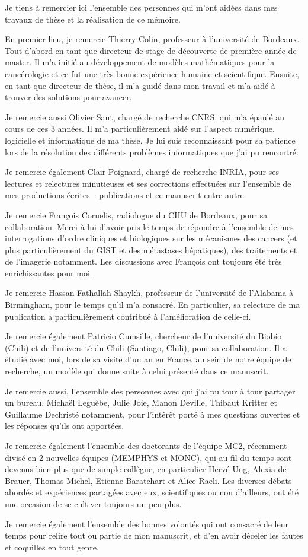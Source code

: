 Je tiens à remercier ici  l'ensemble des personnes qui m'ont aidées dans mes travaux de thèse et la réalisation de ce mémoire.

En premier lieu, je remercie Thierry Colin, professeur à l'université de Bordeaux. Tout d'abord en tant que directeur de stage de découverte de première année de master. Il m'a initié au développement de modèles mathématiques pour la cancérologie et ce fut une très bonne expérience humaine et scientifique. Ensuite, en tant que directeur de thèse, il m'a guidé dans mon travail et m'a aidé à trouver des solutions pour avancer. 

Je remercie aussi Olivier Saut, chargé de recherche CNRS, qui m'a épaulé au cours de ces 3 années. Il m'a particulièrement aidé sur l'aspect numérique, logicielle et informatique de ma thèse. Je lui suis reconnaissant pour sa patience lors de la résolution des différents problèmes informatiques que j'ai pu rencontré. 

Je remercie également Clair Poignard, chargé de recherche INRIA, pour ses lectures et relectures minutieuses et ses corrections effectuées sur l'ensemble de mes productions écrites~: publications et ce manuscrit entre autre.

Je remercie François Cornelis, radiologue du CHU de Bordeaux, pour sa collaboration. Merci à lui d'avoir pris le temps de répondre à l'ensemble de mes interrogations d'ordre cliniques et biologiques sur les mécanismes des cancers (et plus particulièrement du GIST et des métastases hépatiques), des traitements et de l'imagerie notamment. Les discussions avec François ont toujours été très enrichissantes pour moi. 

Je remercie Hassan Fathallah-Shaykh, professeur de l'université de l'Alabama à Birmingham, pour le temps qu'il m'a consacré. En particulier, sa relecture de ma publication a particulièrement contribué  à l'amélioration de celle-ci.

Je remercie également Patricio Cumsille, chercheur de l'université du Biobío (Chili) et de l'université du Chili (Santiago, Chili), pour sa collaboration. Il a étudié avec moi, lors de sa visite d'un an en France, au sein de notre équipe de recherche, un modèle qui donne suite à celui présenté dans ce manuscrit. 

Je remercie aussi, l'ensemble des personnes avec qui j'ai pu tour à tour partager un bureau. Michaël Leguèbe, Julie Joie, Manon Deville, Thibaut Kritter et Guillaume Dechristé notamment, pour l'intérêt porté à mes questions ouvertes et les réponses qu'ils ont apportées.

Je remercie également l'ensemble des doctorants de l'équipe MC2, récemment divisé en 2 nouvelles équipes (MEMPHYS et MONC), qui au fil du temps sont devenus bien plus que de simple collègue, en particulier Hervé Ung, Alexia de Brauer, Thomas Michel, Etienne Baratchart et Alice Raeli. Les diverses débats abordés et expériences partagées avec eux, scientifiques ou non d'ailleurs, ont été une occasion de se cultiver toujours un peu plus.

Je remercie également l'ensemble des bonnes volontés qui ont consacré de leur temps pour relire tout ou partie de mon manuscrit, et d'en avoir déceler les fautes et coquilles en tout genre. 
